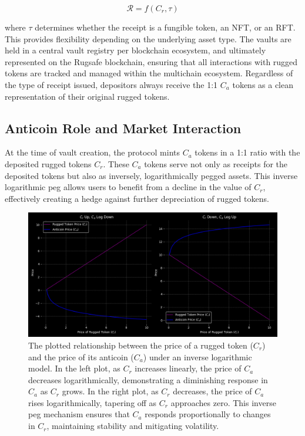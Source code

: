 \documentclass{article}
\begin{document}
\[
\mathcal{R} = f(C_r, \tau)
\]

where $\tau$ determines whether the receipt is a fungible token, an NFT, or an RFT. This provides flexibility depending on the underlying asset type. The vaults are held in a central vault registry per blockchain ecosystem, and ultimately represented on the Rugsafe blockchain, ensuring that all interactions with rugged tokens are tracked and managed within the multichain ecosystem. Regardless of the type of receipt issued, depositors always receive the 1:1 $C_a$ tokens as a clean representation of their original rugged tokens.




\subsection{Anticoin Role and Market Interaction}

At the time of vault creation, the protocol mints $C_a$ tokens in a 1:1 ratio with the deposited rugged tokens $C_r$. These $C_a$ tokens serve not only as receipts for the deposited tokens but also as inversely, logarithmically pegged assets. This inverse logarithmic peg allows users to benefit from a decline in the value of $C_r$, effectively creating a hedge against further depreciation of rugged tokens.

\begin{figure}[h]
\centering
\includegraphics[width=\textwidth]{images/anticoins.png}
\caption{The plotted relationship between the price of a rugged token ($C_r$) and the price of its anticoin ($C_a$) under an inverse logarithmic model. In the left plot, as $C_r$ increases linearly, the price of $C_a$ decreases logarithmically, demonstrating a diminishing response in $C_a$ as $C_r$ grows. In the right plot, as $C_r$ decreases, the price of $C_a$ rises logarithmically, tapering off as $C_r$ approaches zero. This inverse peg mechanism ensures that $C_a$ responds proportionally to changes in $C_r$, maintaining stability and mitigating volatility.}
\label{fig:anticoins_plot}
\end{figure}
\end{document}
